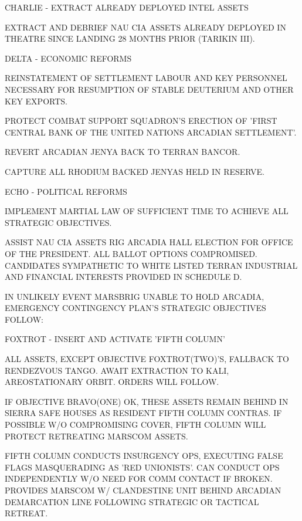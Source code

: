 \item { CHARLIE} - EXTRACT ALREADY DEPLOYED INTEL ASSETS
    \startitemize[n]
    \item EXTRACT AND DEBRIEF NAU CIA ASSETS ALREADY DEPLOYED IN THEATRE SINCE LANDING 28 MONTHS PRIOR (TARIKIN III).
    \stopitemize

\item { DELTA} - ECONOMIC REFORMS
    \startitemize[n]
    \item REINSTATEMENT OF SETTLEMENT LABOUR AND KEY PERSONNEL NECESSARY FOR RESUMPTION OF STABLE DEUTERIUM AND OTHER KEY EXPORTS.
    \item PROTECT COMBAT SUPPORT SQUADRON'S ERECTION OF 'FIRST CENTRAL BANK OF THE UNITED NATIONS ARCADIAN SETTLEMENT'.
    \item REVERT ARCADIAN JENYA BACK TO TERRAN BANCOR.
    \item CAPTURE ALL RHODIUM BACKED JENYAS HELD IN RESERVE.
    \stopitemize

\item { ECHO} - POLITICAL REFORMS
    \startitemize[n]
    \item IMPLEMENT MARTIAL LAW OF SUFFICIENT TIME TO ACHIEVE ALL STRATEGIC OBJECTIVES.
    \item ASSIST NAU CIA ASSETS RIG ARCADIA HALL ELECTION FOR OFFICE OF THE PRESIDENT. ALL BALLOT OPTIONS COMPROMISED. CANDIDATES SYMPATHETIC TO WHITE LISTED TERRAN INDUSTRIAL AND FINANCIAL INTERESTS PROVIDED IN SCHEDULE D.
    \stopitemize
\stopitemize

IN UNLIKELY EVENT MARSBRIG UNABLE TO HOLD ARCADIA, EMERGENCY CONTINGENCY PLAN'S STRATEGIC OBJECTIVES FOLLOW:
\startitemize[4]
\item { FOXTROT} - INSERT AND ACTIVATE 'FIFTH COLUMN'

    \startitemize[n]
    \item ALL ASSETS, EXCEPT OBJECTIVE FOXTROT(TWO)'S, FALLBACK TO RENDEZVOUS TANGO. AWAIT EXTRACTION TO KALI, AREOSTATIONARY ORBIT. ORDERS WILL FOLLOW.

    \item IF OBJECTIVE BRAVO(ONE) OK, THESE ASSETS REMAIN BEHIND IN SIERRA SAFE HOUSES AS RESIDENT FIFTH COLUMN CONTRAS. IF POSSIBLE W/O COMPROMISING COVER, FIFTH COLUMN WILL PROTECT RETREATING MARSCOM ASSETS.

    \item FIFTH COLUMN CONDUCTS INSURGENCY OPS, EXECUTING FALSE FLAGS MASQUERADING AS 'RED UNIONISTS'. CAN CONDUCT OPS INDEPENDENTLY W/O NEED FOR COMM CONTACT IF BROKEN. PROVIDES MARSCOM W/ CLANDESTINE UNIT BEHIND ARCADIAN DEMARCATION LINE FOLLOWING STRATEGIC OR TACTICAL RETREAT.

